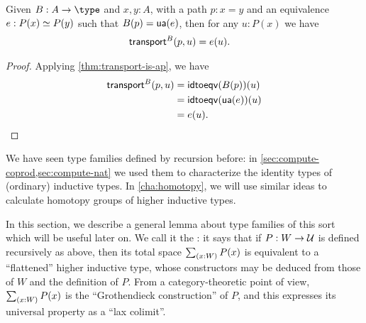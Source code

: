 \begin{lem}\label{thm:transport-is-given}
  Given $B:A\to\type$ and $x,y:A$, with a path $p:x=y$ and an equivalence $e:P(x) \simeq P(y)$ such that ${B}\mathopen{}\left({p}\right)\mathclose{} = \mathsf{ua}(e)$, then for any $u:P(x)$ we have
  \begin{align*}
    \mathsf{transport}^{B}(p,u) &= e(u).
  \end{align*}
\end{lem}
\begin{proof}
  Applying \autoref{thm:transport-is-ap}, we have
  \begin{align*}
    \mathsf{transport}^{B}(p,u) &= \mathsf{idtoeqv}({B}\mathopen{}\left({p}\right)\mathclose{})(u)\\
    &= \mathsf{idtoeqv}(\mathsf{ua}(e))(u)\\
    &= e(u).\qedhere
  \end{align*}
\end{proof}

We have seen type families defined by recursion before: in \autoref{sec:compute-coprod,sec:compute-nat} we used them to characterize the identity types of (ordinary) inductive types.
In \autoref{cha:homotopy}, we will use similar ideas to calculate homotopy groups of higher inductive types.

In this section, we describe a general lemma about type families of this sort which will be useful later on.
We call it the :
%
%
it says that if $P:W\to\mathcal{U}$ is defined recursively as above, then its total space $\sm{x:W} P(x)$ is equivalent to a ``flattened'' higher inductive type, whose constructors may be deduced from those of $W$ and the definition of $P$.
From a category-theoretic point of view, $\sm{x:W} P(x)$ is the ``Grothendieck construction'' of $P$, and this expresses its universal property as a ``lax colimit''.

